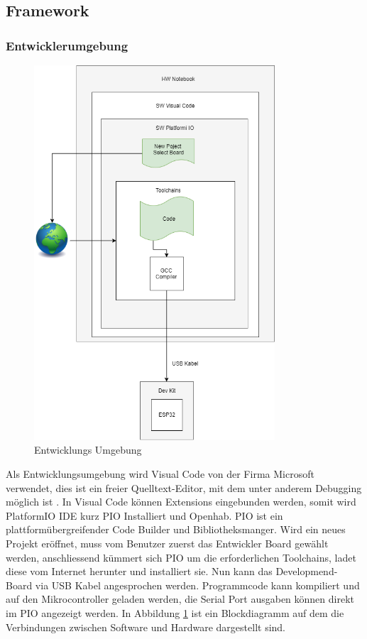 \newpage
\subsection{Framework}\label{subsec: Framework}

\subsubsection{Entwicklerumgebung} 
\begin{figure}[H]
	\centering
	\includegraphics[width=0.8\textwidth]{graphics/DevelopDiagram.png}
	\caption{Entwicklungs Umgebung}
	\label{pic: PIO}
\end{figure} 

Als Entwicklungsumgebung wird Visual Code von der Firma Microsoft verwendet, dies ist ein freier Quelltext-Editor, mit dem unter anderem Debugging möglich ist \cite{noauthor_visual_nodate}. In Visual Code können Extensions eingebunden werden, somit wird PlatformIO IDE \cite{platformio_platformio_nodate} kurz PIO Installiert und Openhab.
PIO ist ein plattformübergreifender Code Builder und Bibliotheksmanger. Wird ein neues Projekt eröffnet, muss vom Benutzer zuerst das Entwickler Board gewählt werden, anschliessend kümmert sich PIO um die erforderlichen Toolchains, ladet diese vom Internet herunter und installiert sie. Nun kann das Developmend-Board via USB Kabel angesprochen werden. Programmcode kann kompiliert und auf den Mikrocontroller geladen werden, die Serial Port ausgaben können direkt im PIO angezeigt werden. In Abbildung \ref{pic: PIO} ist ein Blockdiagramm auf dem die Verbindungen zwischen Software und Hardware dargestellt sind.

